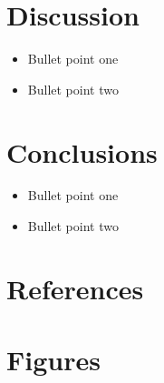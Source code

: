\documentclass[preprint,12pt]{elsarticle}
\begin{document}
\section{Discussion}


\begin{itemize}
\item Bullet point one
\item Bullet point two
\end{itemize}

\section{Conclusions}

\begin{itemize}
\item Bullet point one
\item Bullet point two
\end{itemize}

\section{References}


 

\section{Figures}
\end{document}
